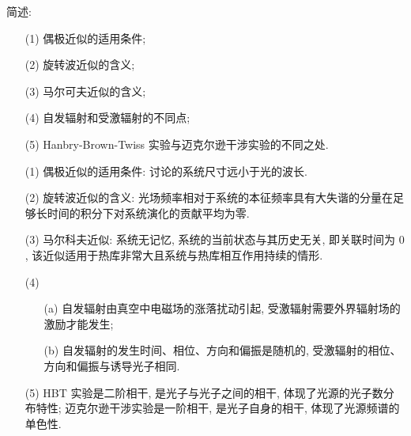 \documentclass{assignment}
\begin{document}
\begin{prob}
    简述:
    \begin{itemize}
        \item[(1)] 偶极近似的适用条件;
        \item[(2)] 旋转波近似的含义;
        \item[(3)] 马尔可夫近似的含义;
        \item[(4)] 自发辐射和受激辐射的不同点;
        \item[(5)] Hanbry-Brown-Twiss 实验与迈克尔逊干涉实验的不同之处.
    \end{itemize}
\end{prob}
\begin{sol}
    \begin{itemize}
        \item[(1)] 偶极近似的适用条件: 讨论的系统尺寸远小于光的波长.
        \item[(2)] 旋转波近似的含义: 光场频率相对于系统的本征频率具有大失谐的分量在足够长时间的积分下对系统演化的贡献平均为零.
        \item[(3)] 马尔科夫近似: 系统无记忆, 系统的当前状态与其历史无关, 即关联时间为 $0$, 该近似适用于热库非常大且系统与热库相互作用持续的情形.
        \item[(4)] 
        \begin{itemize}
            \item[(a)] 自发辐射由真空中电磁场的涨落扰动引起, 受激辐射需要外界辐射场的激励才能发生;
            \item[(b)] 自发辐射的发生时间、相位、方向和偏振是随机的, 受激辐射的相位、方向和偏振与诱导光子相同.
        \end{itemize}
        \item[(5)] HBT 实验是二阶相干, 是光子与光子之间的相干, 体现了光源的光子数分布特性; 迈克尔逊干涉实验是一阶相干, 是光子自身的相干, 体现了光源频谱的单色性.
    \end{itemize}
\end{sol}
\end{document}

